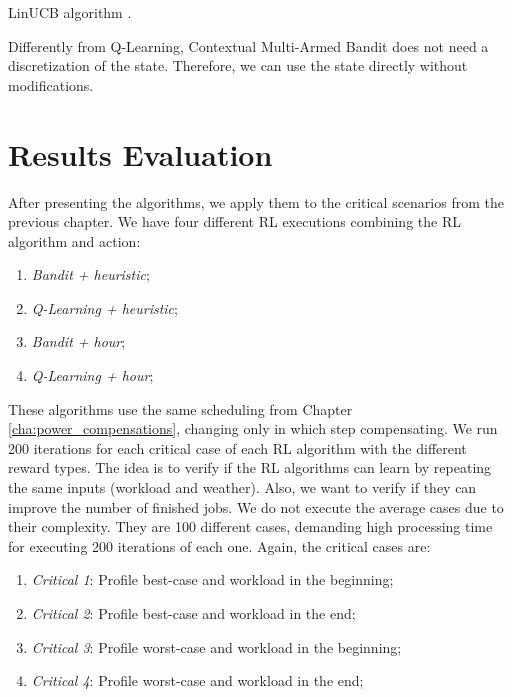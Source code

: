 \IncMargin{1em}
\begin{algorithm}[!htb]
    \footnotesize
    \SetAlgoLined
    \caption{LinUCB algorithm \cite{li2010contextual}.}
    \label{alg:linucb}
\end{algorithm}
\DecMargin{1em}

Differently from Q-Learning, Contextual Multi-Armed Bandit does not need a discretization of the state. Therefore, we can use the state directly without modifications.

\section{Results Evaluation}

After presenting the algorithms, we apply them to the critical scenarios from the previous chapter. We have four different RL executions combining the RL algorithm and action: 

\begin{enumerate}
    \item \emph{Bandit + heuristic};
    \item \emph{Q-Learning + heuristic};
    \item \emph{Bandit + hour};
    \item \emph{Q-Learning + hour};
\end{enumerate}

These algorithms use the same scheduling from Chapter \ref{cha:power_compensations}, changing only in which step compensating. We run 200 iterations for each critical case of each RL algorithm with the different reward types. The idea is to verify if the RL algorithms can learn by repeating the same inputs (workload and weather). Also, we want to verify if they can improve the number of finished jobs. We do not execute the average cases due to their complexity. They are 100 different cases, demanding high processing time for executing 200 iterations of each one. Again, the critical cases are:
\begin{enumerate}
    \item \emph{Critical 1}: Profile best-case and workload in the beginning;
    \item \emph{Critical 2}: Profile best-case and workload in the end;
    \item \emph{Critical 3}: Profile worst-case and workload in the beginning;
    \item \emph{Critical 4}: Profile worst-case and workload in the end;
\end{enumerate}

